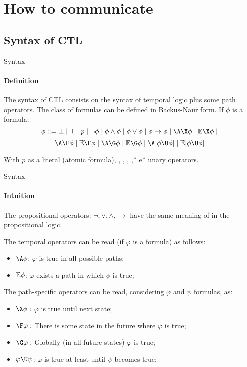 \section{How to communicate}
\subsection{Syntax of CTL}
\begin{frame}{Syntax}
	\framesubtitle{Definition}
	The syntax of CTL consists on the syntax of temporal logic plus some path operators. The class of formulas can be defined in Backus-Naur form. If $\phi$ is a formula: \pause
	$$\phi ::= \bot \; | \; \top \; | \; p \; | \; \neg \phi \; | \; \phi \land \phi \; | \; \phi \lor \phi \; | \; \phi \to \phi \; | \; \A\X \phi \; | \; \E\X \phi \; | $$
	$$\A\F \phi \; | \; \E\F \phi \; | \; \A\G \phi \; | \; \E\G \phi \; | \; \A[\phi \U \phi] \; | \; \E[\phi \U \phi]$$\pause
	
	With $p$ as a literal (atomic formula), \A\X, \E\X, \A\F, \E\F, \A\G \, e \E\G \, unary operators.
	
\end{frame}

\begin{frame}{Syntax}
	\framesubtitle{Intuition}
	The propositional operators: $\neg, \lor, \land, \to$ have the same meaning of in the propositional logic.\pause
	
	The temporal operators can be read (if $\varphi$ is a formula) as follows: \pause
	\begin{itemize}
		\item 
		{
			$\A \phi$: $\varphi$ is true in all possible paths;
			\pause
		}
		\item 
		{
			$\mathbb{E} \phi$: $\varphi$ exists a path in which $\phi$ is true;
			\pause
		}
	\end{itemize}
	
	The path-specific operators can be read, considering $\varphi$ and $\psi$ formulas, as: \pause
	\begin{itemize}
		\item 
		{
			$\X \phi:$ $\varphi$ is  true until next state;
			\pause
		}
		\item 
		{
			$\F \varphi:$ There is some state in the future where $\varphi$ is true;
			\pause
		}
		\item
		{
			$\G \varphi: $ Globally (in all future states) $\varphi$ is true;
			\pause
		}
		\item
		{
			$\varphi \U \psi$: $\varphi$ is true at least until $\psi$ becomes true;	
		}
	\end{itemize}
	
\end{frame}


